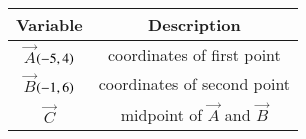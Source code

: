 \begin{tabular}[12pt]{ |c| c|}
    \hline
        \textbf{Variable}  & \textbf{Description} \\
    \hline
        $\vec{A}$$\left(-5,4\right)$ &  coordinates of first point \\
    \hline 
        $\vec{B}$$\left(-1,6\right)$ & coordinates of second point \\
    \hline
        $\vec{C}$& midpoint of $\vec{A}$ and $\vec{B}$ \\ 
    \hline       
\end{tabular}

